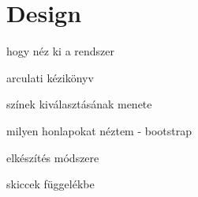 \chapter{Design}
hogy néz ki a rendszer

arculati kézikönyv

színek kiválasztásának menete

milyen honlapokat néztem - bootstrap

elkészítés módszere

skiccek függelékbe